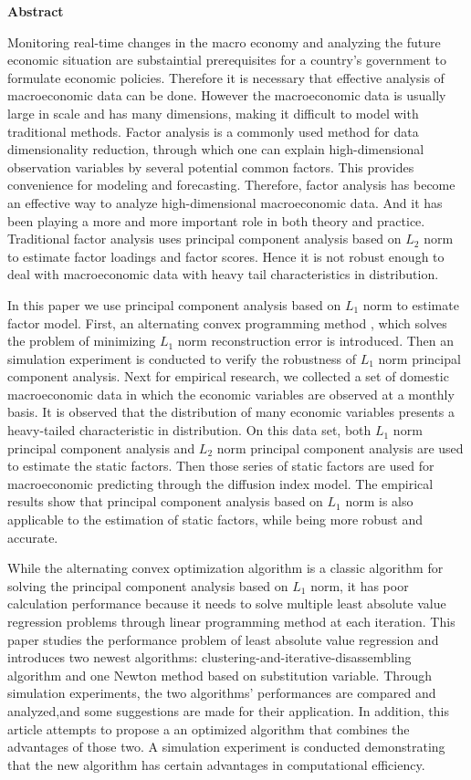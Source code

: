\centerline{\large\bf Abstract}
\vspace{2ex}
Monitoring real-time changes in the macro economy and analyzing 
the future economic situation are substaintial prerequisites for 
a country's government to formulate economic policies.
Therefore it is necessary that effective analysis of macroeconomic data can be done. 
However the macroeconomic data is usually large in scale
and has many dimensions, making it difficult to model with traditional methods.
Factor analysis is a commonly used method for data dimensionality reduction, through which
one can explain high-dimensional observation variables by several potential common factors.
This provides convenience for modeling and forecasting.
Therefore, factor analysis has become an effective way to analyze 
high-dimensional macroeconomic data. And it has been playing a more and more
 important role in both theory and practice.
 Traditional factor analysis uses principal component analysis based 
 on $L_2$ norm to estimate factor loadings and factor scores. Hence it is not robust enough
  to deal with
macroeconomic data with heavy tail characteristics in distribution.

\thispagestyle{plain}
In this paper we use principal component analysis based on $L_1$ norm to 
estimate factor model. First, an alternating convex programming method , which solves 
the problem of minimizing $L_1$ norm reconstruction error 
is introduced. Then an simulation experiment is conducted to verify the robustness of $L_1$ norm
principal component analysis. 
Next for empirical research, we collected a set of
domestic macroeconomic data in which the economic variables are observed at a monthly basis.
It is observed that the distribution of many economic variables presents a heavy-tailed characteristic 
in distribution.
On this data set, both
$L_1$ norm principal component analysis and $L_2$ 
norm principal component analysis are used to estimate the static factors. Then 
those series of static factors are used for macroeconomic predicting through the diffusion index model.
The empirical results show that principal component analysis based on
$L_1$ norm is also applicable to the estimation of static factors, 
while being more robust and accurate.

While the alternating convex optimization algorithm is a classic 
algorithm for solving the principal component analysis based on $L_1$ norm, it has 
poor calculation performance because it
needs to solve multiple least absolute value regression 
problems through linear programming method at each iteration.
This paper studies the performance problem of least absolute 
value regression and introduces two newest algorithms: 
clustering-and-iterative-disassembling algorithm and
one Newton method based on substitution variable. 
Through simulation experiments, the two algorithms' performances
are compared and analyzed,and some suggestions are made for their application.
In addition, this article attempts to propose a
an optimized algorithm that combines the advantages of those two.
A simulation experiment is conducted  demonstrating that the new algorithm 
has certain advantages in computational efficiency.

